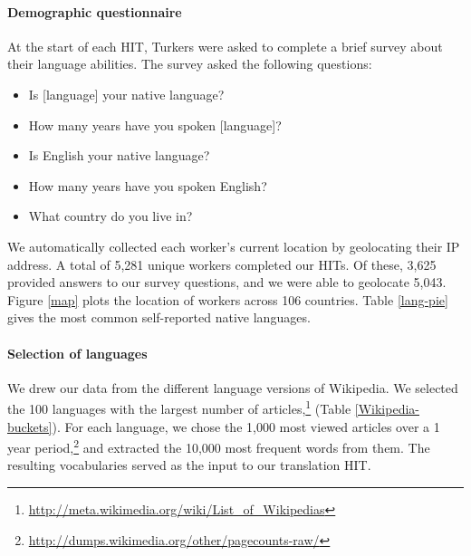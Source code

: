 \documentclass[11pt]{article}
\begin{document}
\paragraph{Demographic questionnaire}

At the start of each HIT, Turkers were asked to complete a brief survey about their language abilities. The survey asked the following questions:
\begin{itemize}
\item Is [language] your native language? 
\item How many years have you spoken [language]? 
\item Is English your native language? 
\item How many years have you spoken English?
\item What country do you live in?
\end{itemize}
We automatically collected each worker's current location by geolocating their IP address.  A total of 5,281 unique workers completed our HITs. Of these, 3,625 provided answers to our survey questions, and we were able to geolocate 5,043. Figure \ref{map} plots the location of workers across 106 countries.  Table \ref{lang-pie} gives the most common self-reported native languages. 

\paragraph{Selection of languages}

We drew our data from the different language versions of Wikipedia.   We selected the 100 languages with the largest number of articles,\footnote{\url{http://meta.wikimedia.org/wiki/List_of_Wikipedias}} (Table \ref{Wikipedia-buckets}). For each language, we chose the 1,000 most viewed articles over a 1 year period,\footnote{\url{http://dumps.wikimedia.org/other/pagecounts-raw/}} and extracted the 10,000 most frequent words from them. The resulting vocabularies served as the input to our translation HIT.
\end{document}
